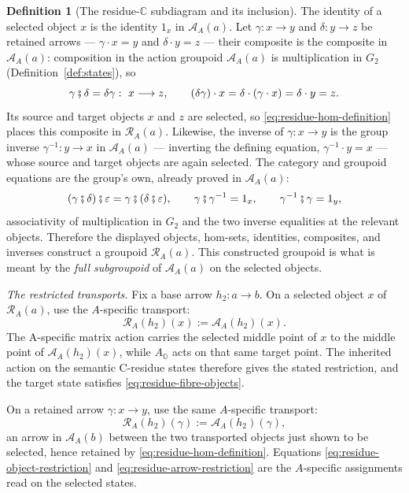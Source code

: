 \documentclass[11pt]{article}
\newcommand{\OO}{\mathbb{O}}
\newcommand{\CC}{\mathbb{C}}
\theoremstyle{plain}
\theoremstyle{definition}
\newtheorem{definition}[theorem]{Definition}
\theoremstyle{remark}
\begin{document}
\begin{definition}[The residue-$\CC$ subdiagram and its inclusion]
The identity of a selected object $x$ is the identity $1_x$ in
$\mathcal A_A(a)$.  Let
$\gamma:x\to y$ and $\delta:y\to z$ be retained arrows --- $\gamma\cdot
x=y$ and $\delta\cdot y=z$ --- their composite is the composite in
$\mathcal A_A(a)$:
composition in the action groupoid $\mathcal A_A(a)$ is multiplication in
$G_2$ (Definition~\ref{def:states}), so
\[
  \gamma\fatsemi\delta=\delta\gamma:\ x\longrightarrow z,
  \qquad
  (\delta\gamma)\cdot x=\delta\cdot(\gamma\cdot x)=\delta\cdot y=z.
\]
Its source and target objects $x$ and $z$ are selected, so
\eqref{eq:residue-hom-definition} places this composite in
$\mathcal R_A(a)$.  Likewise, the inverse of $\gamma:x\to y$ is the
group inverse $\gamma^{-1}:y\to x$ in $\mathcal A_A(a)$ --- inverting the defining
equation, $\gamma^{-1}\cdot y=x$ --- whose source and target objects are again
selected.  The category and groupoid equations are the group's own, already
proved in $\mathcal A_A(a)$:
\[
 (\gamma\fatsemi\delta)\fatsemi\varepsilon
   =\gamma\fatsemi(\delta\fatsemi\varepsilon),\qquad
 \gamma\fatsemi\gamma^{-1}=1_x,\qquad
 \gamma^{-1}\fatsemi\gamma=1_y,
\]
associativity of multiplication in $G_2$ and the two inverse equalities at
the relevant objects.  Therefore the displayed objects, hom-sets, identities,
composites, and inverses construct a groupoid $\mathcal R_A(a)$.  This
constructed groupoid is what is meant by the \emph{full subgroupoid} of
$\mathcal A_A(a)$ on the selected objects.

\emph{The restricted transports.}
Fix a base arrow $h_2:a\to b$.  On a selected object $x$ of
$\mathcal R_A(a)$, use the $A$-specific transport:
\[
  \mathcal R_A(h_2)(x):=\mathcal A_A(h_2)(x).           \tag{Obj}\label{eq:residue-object-restriction}
\]
The A-specific matrix action carries the selected middle point of $x$
to the middle point of $\mathcal A_A(h_2)(x)$, while $A_{\OO}$ acts on
that same target point. The inherited action on the semantic C-residue
states therefore gives the stated restriction, and the target state
satisfies \eqref{eq:residue-fibre-objects}.

On a retained arrow $\gamma:x\to y$, use the same $A$-specific
transport:
\[
 \mathcal R_A(h_2)(\gamma):=\mathcal A_A(h_2)(\gamma),
                                                        \tag{A}\label{eq:residue-arrow-restriction}
\]
an arrow in $\mathcal A_A(b)$ between the two transported objects just shown to be
selected, hence retained by \eqref{eq:residue-hom-definition}.  Equations
\eqref{eq:residue-object-restriction} and
\eqref{eq:residue-arrow-restriction} are the $A$-specific assignments read on
the selected states.


\end{definition}
\end{document}
